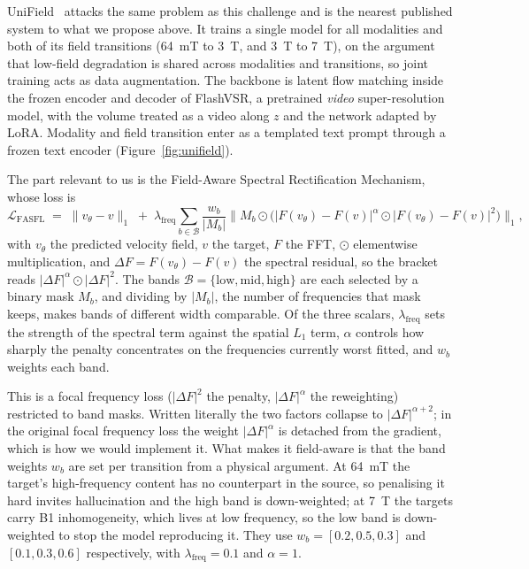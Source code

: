 \documentclass[11pt,a4paper]{article}
\begin{document}
UniField~\cite{lin2026unifield} attacks the same problem as this challenge and is the nearest published
system to what we propose above. It trains a single model for all modalities and both of its field
transitions (\SI{64}{\milli\tesla} to \SI{3}{\tesla}, and \SI{3}{\tesla} to \SI{7}{\tesla}), on the
argument that low-field degradation is shared across modalities and transitions, so joint training acts
as data augmentation. The backbone is latent flow matching inside the frozen encoder and decoder of
FlashVSR, a pretrained \emph{video} super-resolution model, with the volume treated as a video along $z$
and the network adapted by LoRA. Modality and field transition enter as a templated text prompt through
a frozen text encoder (Figure~\ref{fig:unifield}).

The part relevant to us is the Field-Aware Spectral Rectification Mechanism, whose loss is
\begin{equation}
  \mathcal{L}_{\text{FASFL}} \;=\; \lVert v_\theta - v \rVert_1
  \;+\; \lambda_{\text{freq}} \sum_{b \in \mathcal{B}} \frac{w_b}{|M_b|}
  \Big\lVert M_b \odot \big( |F(v_\theta) - F(v)|^{\alpha} \odot |F(v_\theta) - F(v)|^{2} \big) \Big\rVert_1 ,
\end{equation}
with $v_\theta$ the predicted velocity field, $v$ the target, $F$ the FFT, $\odot$ elementwise
multiplication, and $\Delta F = F(v_\theta) - F(v)$ the spectral residual, so the bracket reads
$|\Delta F|^{\alpha} \odot |\Delta F|^{2}$. The bands $\mathcal{B} = \{\text{low}, \text{mid},
\text{high}\}$ are each selected by a binary mask $M_b$, and dividing by $|M_b|$, the number of
frequencies that mask keeps, makes bands of different width comparable. Of the three scalars,
$\lambda_{\text{freq}}$ sets the strength of the spectral term against the spatial $L_1$ term, $\alpha$
controls how sharply the penalty concentrates on the frequencies currently worst fitted, and $w_b$
weights each band.

This is a focal frequency loss ($|\Delta F|^2$ the penalty, $|\Delta F|^{\alpha}$ the reweighting)
restricted to band masks. Written literally the two factors collapse to $|\Delta F|^{\alpha + 2}$; in
the original focal frequency loss the weight $|\Delta F|^{\alpha}$ is detached from the gradient, which
is how we would implement it. What makes it field-aware is that the band weights
$w_b$ are set per transition from a physical argument. At \SI{64}{\milli\tesla} the target's
high-frequency content has no counterpart in the source, so penalising it hard invites hallucination and
the high band is down-weighted; at \SI{7}{\tesla} the targets carry B1 inhomogeneity, which lives at low
frequency, so the low band is down-weighted to stop the model reproducing it. They use
$w_b = [0.2, 0.5, 0.3]$ and $[0.1, 0.3, 0.6]$ respectively, with $\lambda_{\text{freq}} = 0.1$ and
$\alpha = 1$.
\end{document}
